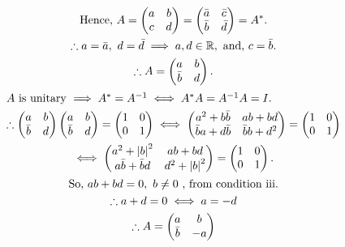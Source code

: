 \documentclass[a4paper,12pt]{report}
\begin{document}
\begin{gather*}
  \text{Hence,}\ A = \begin{pmatrix} a & b \\ c & d \end{pmatrix} = \begin{pmatrix} \bar{a} & \bar{c} \\ \bar{b} & \bar{d} \end{pmatrix} = A^*. \\
  \tf a = \bar{a},\ d = \bar{d} \implies a,d\in\bbr,\ \text{and,}\ c = \bar{b}. \\
  \tf A = \begin{pmatrix} a & b \\ \bar{b} & d \end{pmatrix}. \\
  \intertext{$A$ is unitary $\implies A^* = A\inv \iff A^*A = A\inv A = I$.}
  \tf\begin{pmatrix} a & b \\ \bar{b} & d \end{pmatrix}\begin{pmatrix} a & b \\ \bar{b} & d \end{pmatrix} = \begin{pmatrix} 1 & 0 \\ 0 & 1 \end{pmatrix} \iff
  \begin{pmatrix} a^2 + b\bar{b} & ab + bd \\ \bar{b}a + d\bar{b} & \bar{b}b + d^2 \end{pmatrix} = \begin{pmatrix} 1 & 0 \\ 0 & 1 \end{pmatrix} \\
  \iff \begin{pmatrix} a^2 + \abs{b}^2 & ab + bd \\ a\bar{b} + \bar{b}d & d^2 + \abs{b}^2 \end{pmatrix} = \begin{pmatrix} 1 & 0 \\ 0 & 1 \end{pmatrix}. \\
  \text{So,}\ ab + bd = 0,\ b\neq0\ \text{, from condition iii.} \\
  \tf a + d = 0 \iff a = -d \\
  \tf A = \begin{pmatrix} a & b \\ \bar{b} & -a \end{pmatrix}

\end{gather*}
\end{document}
